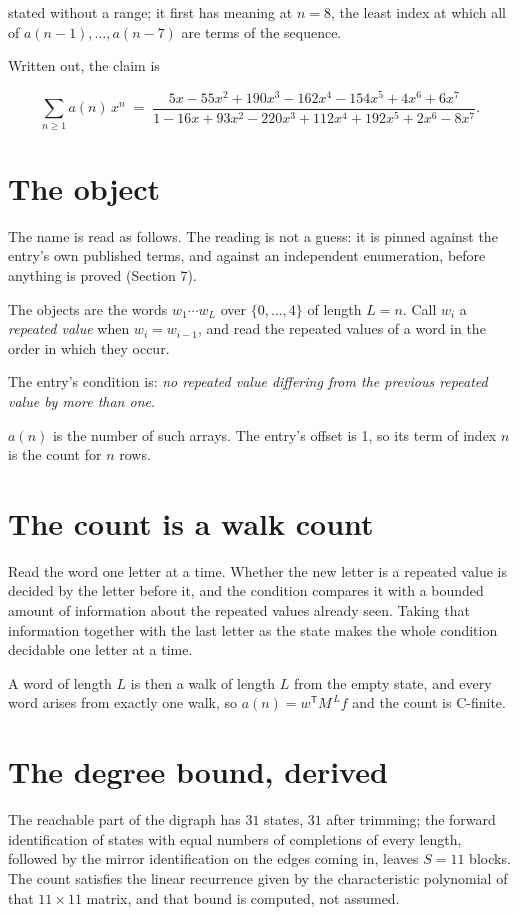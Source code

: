 \documentclass[11pt]{article}
\theoremstyle{definition}
\begin{document}
stated without a range; it first has meaning at $n = 8$, the least index at which all of $a(n-1),\dots,a(n-7)$ are terms of the sequence.

Written out, the claim is

\[\sum_{n \ge 1} a(n)\,x^n \;=\; \frac{5x - 55x^{2} + 190x^{3} - 162x^{4} - 154x^{5} + 4x^{6} + 6x^{7}}{1 - 16x + 93x^{2} - 220x^{3} + 112x^{4} + 192x^{5} + 2x^{6} - 8x^{7}}.\]

\section{The object}

The name is read as follows. The reading is not a guess: it is pinned against the entry's own published terms, and against an independent enumeration, before anything is proved (Section 7).

The objects are the words $w_1\cdots w_L$ over $\{0,\dots,4\}$ of length $L = n$. Call $w_i$ a {\itshape repeated value} when $w_i = w_{i-1}$, and read the repeated values of a word in the order in which they occur.

The entry's condition is: {\itshape no repeated value differing from the previous repeated value by more than one}.

$a(n)$ is the number of such arrays. The entry's offset is 1, so its term of index $n$ is the count for $n$ rows.

\section{The count is a walk count}

Read the word one letter at a time. Whether the new letter is a repeated value is decided by the letter before it, and the condition compares it with a bounded amount of information about the repeated values already seen. Taking that information together with the last letter as the state makes the whole condition decidable one letter at a time.

A word of length $L$ is then a walk of length $L$ from the empty state, and every word arises from exactly one walk, so $a(n) = w^{\mathsf T}M^{\,L}f$ and the count is C-finite.

\section{The degree bound, derived}

The reachable part of the digraph has $31$ states, $31$ after trimming; the forward identification of states with equal numbers of completions of every length, followed by the mirror identification on the edges coming in, leaves $S = 11$ blocks. The count satisfies the linear recurrence given by the characteristic polynomial of that $11\times11$ matrix, and that bound is computed, not assumed.
\end{document}
